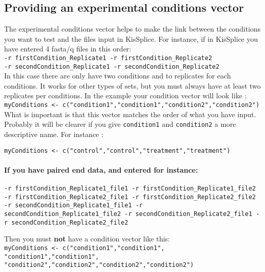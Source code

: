 \documentclass[a4paper,10pt]{article}
\begin{document}
\subsection{Providing an experimental conditions vector}
The experimental conditions vector helps to make the link between the conditions you want to test and the files input in KisSplice. For instance, if in KisSplice you have entered 4 fasta/q files in this order:\\

\texttt{-r firstCondition\_Replicate1 -r firstCondition\_Replicate2\\
-r secondCondition\_Replicate1 -r secondCondition\_Replicate2}\\

In this case there are only have two conditions and to replicates for each conditions. It works for other types of sets, but you must always have at least two replicates per conditions. In the example your condition vector will look like :\\

\texttt{myConditions <- c("condition1","condition1","condition2","condition2")}\\

What is important is that this vector matches the order of what you have input. Probably it will be clearer if you give \texttt{condition1} and \texttt{condition2} a more descriptive name. For instance :

\texttt{myConditions <- c("control","control","treatment","treatment")}\\
 

\paragraph{If you have paired end data, and entered for instance:\\}

\texttt{-r firstCondition\_Replicate1\_file1 -r firstCondition\_Replicate1\_file2
-r firstCondition\_Replicate2\_file1  -r firstCondition\_Replicate2\_file2 
-r secondCondition\_Replicate1\_file1 -r secondCondition\_Replicate1\_file2
-r secondCondition\_Replicate2\_file1 -r secondCondition\_Replicate2\_file2}

Then you must \textbf{not} have a condition vector like this:\\

\texttt{myConditions <- c("condition1","condition1", "condition1","condition1",\\
"condition2","condition2","condition2","condition2")}\\
\end{document}
